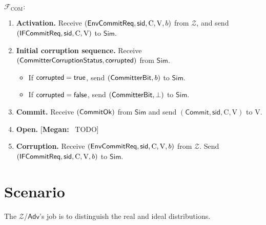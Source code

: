 \documentclass[11pt,letterpaper]{article}
\newcommand{\doclearpage}{%
  \iffull\clearpage\else\fi
}
\newcommand{\authnote}[2]{[{\color{red}\textbf{#1:}}~{\color{blue} #2}]}
\newcommand{\authnote}[2]{}
\newcommand{\megan}[1]{\authnote{Megan}{#1}}
\theoremstyle{plain} %
\theoremstyle{definition} %
\theoremstyle{remark} %
\newcommand{\CommitMsg}{\mathsf{Commit}}
\newcommand{\Simulator}{{\mathsf{Sim}}} %
\newcommand{\Adversary}{{\mathsf{Adv}}} %
\newcommand{\Environment}{{\mathcal{Z}}} %
\newcommand{\IF}{\mathcal{F}} %
\newcommand{\sid}{\mathsf{sid}}
\newcommand{\True}{\mathsf{true}}
\newcommand{\False}{\mathsf{false}}
\newcommand{\IFCom}{\IF_{\mathrm{COM}}}
\newcommand{\PartyCommitter}{\mathrm{C}}
\newcommand{\PartyVerifier}{\mathrm{V}}
\newcommand{\CommittedBit}{b}
\begin{document}
\begin{center}
\begin{minipage}{0.9\textwidth}
$\IFCom:$
\begin{enumerate}
	\item \textbf{Activation.} Receive $(\EnvCommitReqMsg, \sid, \PartyCommitter, \PartyVerifier, \CommittedBit)$ from $\Environment$, and send $(\IFCommitReqMsg, \sid, \PartyCommitter,\PartyVerifier)$ to $\Simulator$.

	\item \textbf{Initial corruption sequence.} Receive $(\mathsf{CommitterCorruptionStatus}, \mathsf{corrupted})$ from $\Simulator$.
	\begin{itemize}
		\item If $\CommitterCorruptedBit = \True$, send $(\CommitterBitMsg, \CommittedBit)$ to $\Simulator$.
		\item If $\CommitterCorruptedBit = \False$, send $(\mathsf{CommitterBit}, \bot)$ to $\Simulator$.
	\end{itemize}

	\item \textbf{Commit.} Receive $(\mathsf{CommitOk})$ from $\Simulator$ and send $(\CommitMsg, \sid, \PartyCommitter, \PartyVerifier)$ to $\PartyVerifier$.

	\item \textbf{Open.} \megan{TODO}

	\item \textbf{Corruption.} Receive $(\EnvCommitReqMsg, \sid, \PartyCommitter, \PartyVerifier, \CommittedBit)$ from $\Environment$. Send $(\IFCommitReqMsg, \sid, \PartyCommitter,\PartyVerifier, \CommittedBit)$ to $\Simulator$.
\end{enumerate}
\end{minipage}
\end{center}

\doclearpage
\section{Scenario}
\label{sec:scenario}

The $\Environment$/$\Adversary$'s job is to distinguish the real and ideal distributions.
\end{document}
